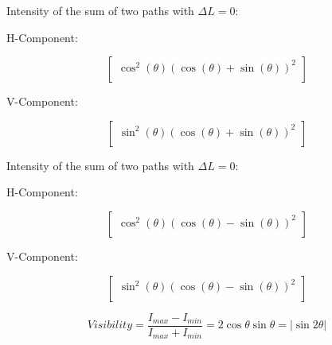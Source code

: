 \documentclass{article}
\begin{document}
\begin{flushleft}
Intensity of the sum of two paths with $\Delta{L} = 0$:
\vspace{5mm}

H-Component:
\end{flushleft}
\[\begin{bmatrix}
\cos^2(\theta)(\cos(\theta)+\sin(\theta))^2\\
\end{bmatrix}
\]
\begin{flushleft}
V-Component:
\end{flushleft}
\[\begin{bmatrix}
\sin^2(\theta)(\cos(\theta)+\sin(\theta))^2\\
\end{bmatrix}
\]
\begin{flushleft}
Intensity of the sum of two paths with $\Delta{L} = 0$:
\vspace{5mm}

H-Component:
\end{flushleft}
\[\begin{bmatrix}
\cos^2(\theta)(\cos(\theta)-\sin(\theta))^2\\
\end{bmatrix}
\]
\begin{flushleft}
V-Component:
\end{flushleft}
\[\begin{bmatrix}
\sin^2(\theta)(\cos(\theta)-\sin(\theta))^2\\
\end{bmatrix}
\]

\begin{equation*}
  Visibility = \frac{I_{max}-I_{min}}{I_{max}+I_{min}}  = 2\cos{\theta}\sin{\theta} = |\sin{2\theta}|
\end{equation*}
\end{document}
